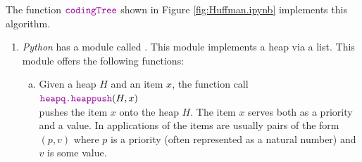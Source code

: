 \noindent
The function $\mytt{codingTree}$ shown in Figure \ref{fig:Huffman.ipynb} implements this algorithm.
\begin{enumerate}
\item \textsl{Python} has a module called .  This module implements a heap via a list.
      This module offers the following functions:
      \begin{enumerate}[(a)]
      \item Given a heap $H$ and an item $x$, the function call
            \\[0.2cm]
            \hspace*{1.3cm}
            $\mytt{heapq.heappush}(H, x)$
            \\[0.2cm]
            pushes the item $x$ onto the heap $H$.  The item $x$ serves both as a priority and a value.
            In applications of  the items are usually pairs of the form $(p, v)$ where $p$ is a
            priority (often represented as a natural number) and $v$ is some value.


\end{enumerate}
\end{enumerate}
